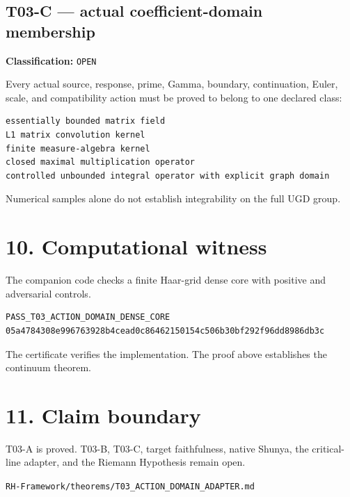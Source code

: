 \hypertarget{t03-c-actual-coefficient-domain-membership}{%
\subsection{T03-C --- actual coefficient-domain membership}\label{t03-c-actual-coefficient-domain-membership}}

\textbf{Classification:} \texttt{OPEN}

Every actual source, response, prime, Gamma, boundary, continuation, Euler,
scale, and compatibility action must be proved to belong to one declared class:

\begin{verbatim}
essentially bounded matrix field
L1 matrix convolution kernel
finite measure-algebra kernel
closed maximal multiplication operator
controlled unbounded integral operator with explicit graph domain
\end{verbatim}

Numerical samples alone do not establish integrability on the full UGD group.

\hypertarget{computational-witness}{%
\section{10. Computational witness}\label{computational-witness}}

The companion code checks a finite Haar-grid dense core with positive and
adversarial controls.

\begin{verbatim}
PASS_T03_ACTION_DOMAIN_DENSE_CORE
05a4784308e996763928b4cead0c86462150154c506b30bf292f96dd8986db3c
\end{verbatim}

The certificate verifies the implementation. The proof above establishes the
continuum theorem.

\hypertarget{claim-boundary}{%
\section{11. Claim boundary}\label{claim-boundary}}

T03-A is proved. T03-B, T03-C, target faithfulness, native Shunya, the
critical-line adapter, and the Riemann Hypothesis remain open.

\begin{flushright}\small\texttt{RH-Framework/theorems/T03\_ACTION\_DOMAIN\_ADAPTER.md}\end{flushright}

